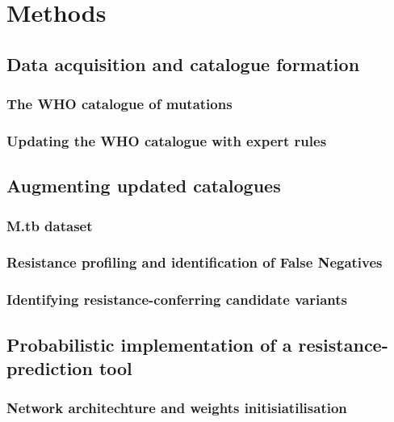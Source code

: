 \graphicspath{{Figures/Methods}}

\chapter{Methods}\label{ch:methods}

\section{Data acquisition and catalogue formation}\label{methods:sec:data_agg}

\subsection{The WHO catalogue of mutations}

\subsection{Updating the WHO catalogue with expert rules}

\section{Augmenting updated catalogues}

\subsection{M.tb dataset}

\subsection{Resistance profiling and identification of False Negatives}

\subsection{Identifying resistance-conferring candidate variants}

\section{Probabilistic implementation of a resistance-prediction tool}

\subsection{Network architechture and weights initisiatilisation}

